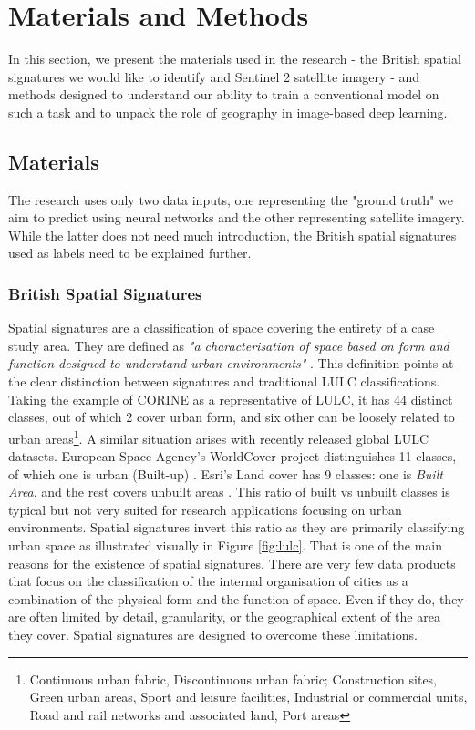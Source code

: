 \section{Materials and Methods}
\label{sec:matmet}

In this section, we present the materials used in the research - the British spatial
signatures we would like to identify and Sentinel 2 satellite
imagery - and methods designed to understand our ability to train a conventional model on
such a task and to unpack the role of geography in image-based deep learning.

\subsection{Materials}

The research uses only two data inputs, one representing the "ground truth" we aim to
predict using neural networks and the other representing satellite
imagery. While the latter does not need much introduction, the British spatial
signatures used as labels need to be explained further.

\subsubsection{British Spatial Signatures}
\label{sec:matmet_ss}

Spatial signatures are a classification of space covering the entirety of a case
study area. They are defined as \textit{"a characterisation of space based on form and
function designed to understand urban environments"} \citep[p.4]{dab_mf_2021a}. This
definition points at the clear distinction between signatures and traditional
LULC classifications. Taking the example of CORINE
\citep{europeanenvironmentagency1990} as a representative of LULC, it has 44 distinct
classes, out of which 2 cover urban form, and six other can be loosely related to urban
areas\footnote{Continuous urban fabric, Discontinuous urban fabric; Construction sites,
Green urban areas, Sport and leisure facilities, Industrial or commercial units, Road
and rail networks and associated land, Port areas}. A similar situation arises with recently
released global LULC datasets. European Space Agency's WorldCover project distinguishes
11 classes, of which one is urban (Built-up) \citep{zanaga_daniele_2021_5571936}. Esri's
Land cover has 9 classes: one is \textit{Built Area}, and the rest covers unbuilt areas
\citep{karra2021global}. This ratio of built vs unbuilt classes is typical but not very
suited for research applications focusing on urban environments. Spatial signatures
invert this ratio as they are primarily classifying urban space as illustrated visually
in Figure \ref{fig:lulc}. That is one of the main reasons for the existence of spatial
signatures. There are very few data products that focus on the classification of the
internal organisation of cities as a combination of the physical form and the function
of space. Even if they do, they are often limited by detail, granularity, or the
geographical extent of the area they cover. Spatial signatures are designed to overcome
these limitations.

